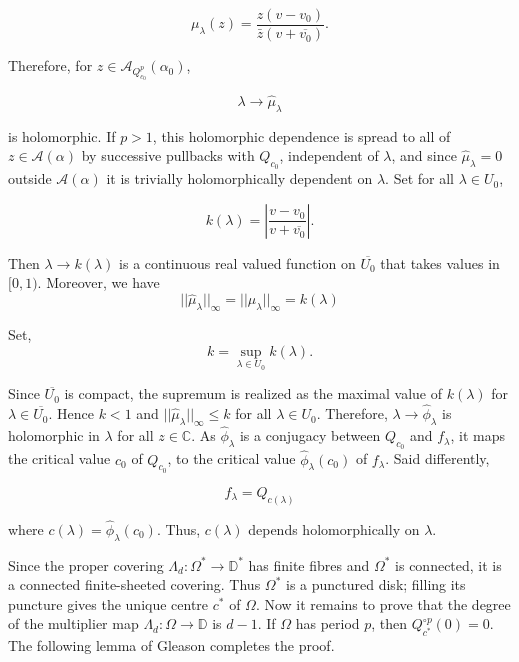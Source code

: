 \documentclass[11pt,a4paper]{article}
\begin{document}
    \[
    \mu_{\lambda}(z) = \frac{z(v-v_0)}{\bar{z}(v+\overline{v_0})}.
    \]

    Therefore, for $z \in \mathcal{A}_{Q^p_{c_0}}(\alpha_0)$,

    $$\lambda \rightarrow \hat{\mu}_{\lambda}$$

    is holomorphic. If $p>1$, this holomorphic dependence is spread to all of $z\in \mathcal{A}(\alpha)$ by successive pullbacks with $Q_{c_0}$, independent of $\lambda$, and since $\hat{\mu}_{\lambda} = 0$ outside $\mathcal{A}(\alpha)$ it is trivially holomorphically dependent on $\lambda$. Set for all $\lambda \in U_0$,

    \[
    k(\lambda) = \left|\frac{v-v_0}{v+\overline{v_0}}\right|.
    \]

    Then $\lambda \rightarrow k(\lambda)$ is a continuous real valued function on $\overline{U_0}$ that takes values in $[0,1)$. Moreover, we have
    $$||\hat{\mu}_{\lambda}||_{\infty} = ||\mu_{\lambda}||_{\infty} = k(\lambda)$$

    Set,
    $$k = \sup_{\lambda \in U_0}{k(\lambda)}.$$

    Since $\overline{U_0}$ is compact, the supremum is realized as the maximal value of $k(\lambda)$ for $\lambda \in \overline{U_0}$. Hence $k<1$ and $||\hat{\mu}_{\lambda}||_{\infty} \leq k$ for all $\lambda \in U_0$. Therefore, $\lambda \rightarrow \hat{\phi}_{\lambda}$ is holomorphic in $\lambda$ for all $z\in \mathbb{C}$. As $\hat{\phi}_{\lambda}$ is a conjugacy between $Q_{c_0}$ and $f_{\lambda}$, it maps the critical value $c_0$ of $Q_{c_0}$, to the critical value $\hat{\phi}_{\lambda}(c_0)$ of $f_{\lambda}$. Said differently,

    $$f_{\lambda} = Q_{c(\lambda)}$$

    where $c(\lambda) = \hat{\phi}_{\lambda}(c_0)$. Thus, $c(\lambda)$ depends holomorphically on $\lambda$.

    Since the proper covering $\Lambda_d:\Omega^*\rightarrow\mathbb{D}^*$ has finite fibres and $\Omega^*$ is connected, it is a connected finite-sheeted covering. Thus $\Omega^*$ is a punctured disk; filling its puncture gives the unique centre $c^*$ of $\Omega$. Now it remains to prove that the degree of the multiplier map $\Lambda_d: \Omega \rightarrow \mathbb{D}$ is $d-1$. If $\Omega$ has period $p$, then $Q^{\circ p}_{c^*}(0)=0$. The following lemma of Gleason completes the proof.
\end{document}
